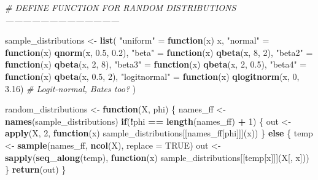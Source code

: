 \documentclass[11pt,]{article}
\newenvironment{Shaded}{\begin{snugshade}}{\end{snugshade}}
\newcommand{\CommentTok}[1]{\textcolor[rgb]{0.56,0.35,0.01}{\textit{#1}}}
\newcommand{\ControlFlowTok}[1]{\textcolor[rgb]{0.13,0.29,0.53}{\textbf{#1}}}
\newcommand{\DataTypeTok}[1]{\textcolor[rgb]{0.13,0.29,0.53}{#1}}
\newcommand{\DecValTok}[1]{\textcolor[rgb]{0.00,0.00,0.81}{#1}}
\newcommand{\FloatTok}[1]{\textcolor[rgb]{0.00,0.00,0.81}{#1}}
\newcommand{\KeywordTok}[1]{\textcolor[rgb]{0.13,0.29,0.53}{\textbf{#1}}}
\newcommand{\NormalTok}[1]{#1}
\newcommand{\OperatorTok}[1]{\textcolor[rgb]{0.81,0.36,0.00}{\textbf{#1}}}
\newcommand{\OtherTok}[1]{\textcolor[rgb]{0.56,0.35,0.01}{#1}}
\newcommand{\StringTok}[1]{\textcolor[rgb]{0.31,0.60,0.02}{#1}}
\begin{document}
\begin{Shaded}
\begin{Highlighting}[]
\CommentTok{# DEFINE FUNCTION FOR RANDOM DISTRIBUTIONS ---------------------------------------}

\NormalTok{sample_distributions <-}\StringTok{ }\KeywordTok{list}\NormalTok{(}
  \StringTok{"uniform"}\NormalTok{ =}\StringTok{ }\ControlFlowTok{function}\NormalTok{(x) x,}
  \StringTok{"normal"}\NormalTok{ =}\StringTok{ }\ControlFlowTok{function}\NormalTok{(x) }\KeywordTok{qnorm}\NormalTok{(x, }\FloatTok{0.5}\NormalTok{, }\FloatTok{0.2}\NormalTok{),}
  \StringTok{"beta"}\NormalTok{ =}\StringTok{ }\ControlFlowTok{function}\NormalTok{(x) }\KeywordTok{qbeta}\NormalTok{(x, }\DecValTok{8}\NormalTok{, }\DecValTok{2}\NormalTok{),}
  \StringTok{"beta2"}\NormalTok{ =}\StringTok{ }\ControlFlowTok{function}\NormalTok{(x) }\KeywordTok{qbeta}\NormalTok{(x, }\DecValTok{2}\NormalTok{, }\DecValTok{8}\NormalTok{),}
  \StringTok{"beta3"}\NormalTok{ =}\StringTok{ }\ControlFlowTok{function}\NormalTok{(x) }\KeywordTok{qbeta}\NormalTok{(x, }\DecValTok{2}\NormalTok{, }\FloatTok{0.5}\NormalTok{),}
  \StringTok{"beta4"}\NormalTok{ =}\StringTok{ }\ControlFlowTok{function}\NormalTok{(x) }\KeywordTok{qbeta}\NormalTok{(x, }\FloatTok{0.5}\NormalTok{, }\DecValTok{2}\NormalTok{),}
  \StringTok{"logitnormal"}\NormalTok{ =}\StringTok{ }\ControlFlowTok{function}\NormalTok{(x) }\KeywordTok{qlogitnorm}\NormalTok{(x, }\DecValTok{0}\NormalTok{, }\FloatTok{3.16}\NormalTok{)}
  \CommentTok{# Logit-normal, Bates too?}
\NormalTok{)}

\NormalTok{random_distributions <-}\StringTok{ }\ControlFlowTok{function}\NormalTok{(X, phi) \{}
\NormalTok{  names_ff <-}\StringTok{ }\KeywordTok{names}\NormalTok{(sample_distributions)}
  \ControlFlowTok{if}\NormalTok{(}\OperatorTok{!}\NormalTok{phi }\OperatorTok{==}\StringTok{ }\KeywordTok{length}\NormalTok{(names_ff) }\OperatorTok{+}\StringTok{ }\DecValTok{1}\NormalTok{) \{}
\NormalTok{    out <-}\StringTok{ }\KeywordTok{apply}\NormalTok{(X, }\DecValTok{2}\NormalTok{, }\ControlFlowTok{function}\NormalTok{(x) }
\NormalTok{      sample_distributions[[names_ff[phi]]](x))}
\NormalTok{  \} }\ControlFlowTok{else}\NormalTok{ \{}
\NormalTok{    temp <-}\StringTok{ }\KeywordTok{sample}\NormalTok{(names_ff, }\KeywordTok{ncol}\NormalTok{(X), }\DataTypeTok{replace =} \OtherTok{TRUE}\NormalTok{)}
\NormalTok{    out <-}\StringTok{ }\KeywordTok{sapply}\NormalTok{(}\KeywordTok{seq_along}\NormalTok{(temp), }\ControlFlowTok{function}\NormalTok{(x) sample_distributions[[temp[x]]](X[, x]))}
\NormalTok{  \}}
  \KeywordTok{return}\NormalTok{(out)}
\NormalTok{\}}
\end{Highlighting}
\end{Shaded}
\end{document}

